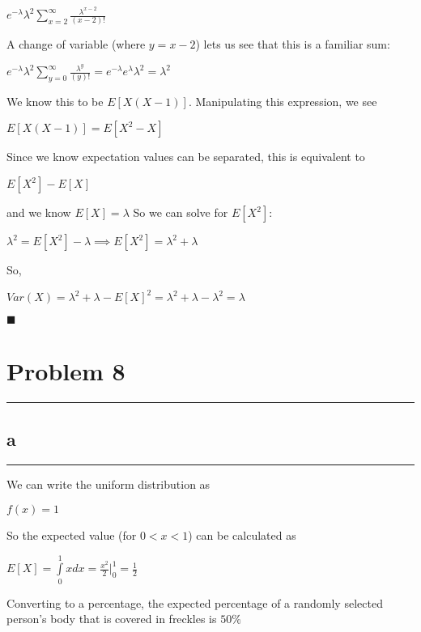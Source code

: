 \documentclass[]{tufte-handout}
\begin{document}
\(e^{-\lambda}\lambda^2\sum\limits_{x=2}^\infty \frac{\lambda^{x-2}}{(x-2)!}\)

A change of variable (where \(y = x-2\)) lets us see that this is a
familiar sum:

\(e^{-\lambda}\lambda^2\sum\limits_{y=0}^\infty \frac{\lambda^{y}}{(y)!} = e^{-\lambda}e^\lambda\lambda^2 = \lambda^2\)

We know this to be \(E[X(X-1)]\). Manipulating this expression, we see

\(E[X(X-1)] = E[X^2-X]\)

Since we know expectation values can be separated, this is equivalent to

\(E[X^2] - E[X]\)

and we know \(E[X] = \lambda\) So we can solve for \(E[X^2]\):

\(\lambda^2 = E[X^2] - \lambda \implies E[X^2] = \lambda^2 + \lambda\)

So,

\(Var(X) =\lambda^2 + \lambda - E[X]^2 = \lambda^2 + \lambda - \lambda^2 = \lambda\)

\begin{marginfigure}
\(\blacksquare\)
\end{marginfigure}

\hypertarget{problem-8}{%
\section{Problem 8}\label{problem-8}}

\begin{center}\rule{0.5\linewidth}{0.5pt}\end{center}

\hypertarget{a-6}{%
\subsection{a}\label{a-6}}

\begin{center}\rule{0.5\linewidth}{0.5pt}\end{center}

We can write the uniform distribution as

\(f(x) = 1\)

So the expected value (for \(0 < x < 1\)) can be calculated as

\(E[X] = \int\limits^1_0 xdx = \frac{x^2}{2}\Big|^1_0 = \frac{1}{2}\)

Converting to a percentage, the expected percentage of a randomly
selected person's body that is covered in freckles is \(50\%\)
\end{document}
